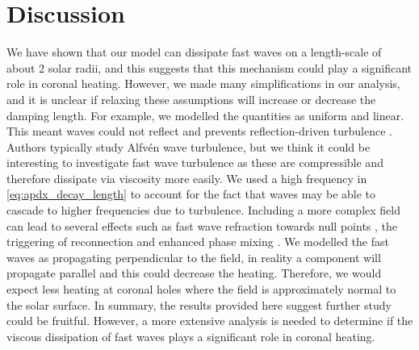 \section{Discussion}

We have shown that our model can dissipate fast waves on a length-scale of about 2 solar radii, and this suggests that this mechanism could play a significant role in coronal heating. However, we made many simplifications in our analysis, and it is unclear if relaxing these assumptions will increase or decrease the damping length. For example, we modelled the quantities as uniform and linear. This meant waves could not reflect and prevents reflection-driven turbulence \citep{Hollweg1986a,vanBallegooijen2011,Shoda2019}. Authors typically study Alfv\'en wave turbulence, but we think it could be interesting to investigate fast wave turbulence as these are compressible and therefore dissipate via viscosity more easily. We used a high frequency in \eqref{eq:apdx_decay_length} to account for the fact that waves may be able to cascade to higher frequencies due to turbulence. Including a more complex field can lead to several effects such as fast wave refraction towards null points \citep{McLaughlin2006,McLaughlin2011,McLaughlin2016}, the triggering of reconnection \citep{McLaughlin2009} and enhanced phase mixing \citep{Similon1989,Howson2020a}. We modelled the fast waves as propagating perpendicular to the field, in reality a component will propagate parallel and this could decrease the heating. Therefore, we would expect less heating at coronal holes where the field is approximately normal to the solar surface. In summary, the results provided here suggest further study could be fruitful. However, a more extensive analysis is needed to determine if the viscous dissipation of fast waves plays a significant role in coronal heating.